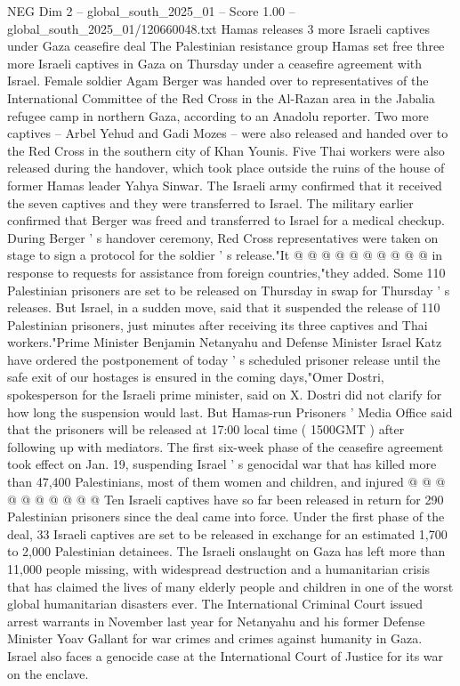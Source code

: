 \begin{textsample}{NEG Dim 2 – global\_south\_2025\_01 – Score 1.00 – global\_south\_2025\_01/120660048.txt}  \label{ex:f2_neg_120}
Hamas releases 3 more Israeli captives under Gaza ceasefire deal The Palestinian resistance group Hamas set free three more Israeli captives in Gaza on Thursday under a ceasefire agreement with Israel.
Female soldier Agam Berger was handed over to representatives of the International Committee of the Red Cross in the Al-Razan area in the Jabalia refugee camp in northern Gaza, according to an Anadolu reporter.
Two more captives -- Arbel Yehud and Gadi Mozes -- were also released and handed over to the Red Cross in the southern city of Khan Younis.
Five Thai workers were also released during the handover, which took place outside the ruins of the house of former Hamas leader Yahya Sinwar.
The Israeli army confirmed that it received the seven captives and they were transferred to Israel.
The military earlier confirmed that Berger was freed and transferred to Israel for a medical checkup.
During Berger ' s handover ceremony, Red Cross representatives were taken on stage to sign a protocol for the soldier ' s release."It @ @ @ @ @ @ @ @ @ @ in response to requests for assistance from foreign countries,"they added.
Some 110 Palestinian prisoners are set to be released on Thursday in swap for Thursday ' s releases.
But Israel, in a sudden move, said that it suspended the release of 110 Palestinian prisoners, just minutes after receiving its three captives and Thai workers."Prime Minister Benjamin Netanyahu and Defense Minister Israel Katz have ordered the postponement of today ' s scheduled prisoner release until the safe exit of our hostages is ensured in the coming days,"Omer Dostri, spokesperson for the Israeli prime minister, said on X.
Dostri did not clarify for how long the suspension would last.
But Hamas-run Prisoners ' Media Office said that the prisoners will be released at 17:00 local time ( 1500GMT ) after following up with mediators.
The first six-week phase of the ceasefire agreement took effect on Jan. 19, suspending Israel ' s genocidal war that has killed more than 47,400 Palestinians, most of them women and children, and injured @ @ @ @ @ @ @ @ @ @ Ten Israeli captives have so far been released in return for 290 Palestinian prisoners since the deal came into force.
Under the first phase of the deal, 33 Israeli captives are set to be released in exchange for an estimated 1,700 to 2,000 Palestinian detainees.
The Israeli onslaught on Gaza has left more than 11,000 people missing, with widespread destruction and a humanitarian crisis that has claimed the lives of many elderly people and children in one of the worst global humanitarian disasters ever.
The International Criminal Court issued arrest warrants in November last year for Netanyahu and his former Defense Minister Yoav Gallant for war crimes and crimes against humanity in Gaza.
Israel also faces a genocide case at the International Court of Justice for its war on the enclave.

\end{textsample}

